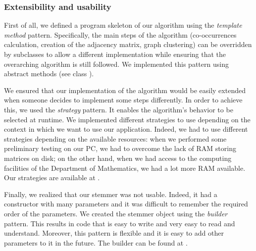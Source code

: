         \subsubsection{Extensibility and usability}
            First of all, we defined a program skeleton of our algorithm using the \emph{template method} pattern. Specifically, the main steps of the algorithm (co-occurrences calculation, creation of the adjacency matrix, graph clustering) can be overridden by subclasses to allow a different implementation while ensuring that the overarching algorithm is still followed. We implemented this pattern using abstract methods (see class ).

            We ensured that our implementation of the algorithm would be easily extended when someone decides to implement some steps differently.
            In order to achieve this, we used the \emph{strategy} pattern. It enables the algorithm's behavior to be selected at runtime. We implemented different strategies to use depending on the context in which we want to use our application. Indeed, we had to use different strategies depending on the available resources: when we performed some preliminary testing on our PC, we had to overcome the lack of RAM storing matrices on disk; on the other hand, when we had access to the computing facilities of the Department of Mathematics\footnotemark{}, we had a lot more RAM available. Our strategies are available at .
            
            Finally, we realized that our stemmer was not usable. Indeed, it had a constructor with many parameters and it was difficult to remember the required order of the parameters. We created the stemmer object using the \emph{builder} pattern. This results in code that is easy to write and very easy to read and understand. Moreover, this pattern is flexible and it is easy to add other parameters to it in the future. The builder can be found at .


